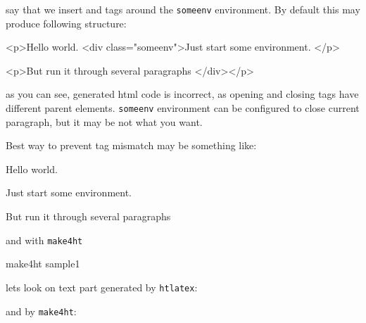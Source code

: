 say that we insert
 and
 tags around  the \texttt{someenv}
environment. By default this may produce following structure:

\begin{htmlsource}
<p>Hello world.
<div class="someenv">Just start some environment.
</p>

<p>But run it through several paragraphs
</div></p>
\end{htmlsource}

as you can see, generated html code is incorrect, as opening and closing
 tags have different parent elements. \texttt{someenv} environment can
be configured to close current paragraph, but it may be not what you
want.

Best way to prevent tag mismatch may be something like:

\begin{texsource}
Hello world.
\begin{someenv}
Just start some environment.
\end{someenv}

\begin{someenv}
But run it through several paragraphs
\end{someenv}
\end{texsource}

and with \texttt{make4ht}

\begin{shellcommand}
make4ht sample1
\end{shellcommand}

lets look on text part generated by \texttt{htlatex}:


and by \texttt{make4ht}:


